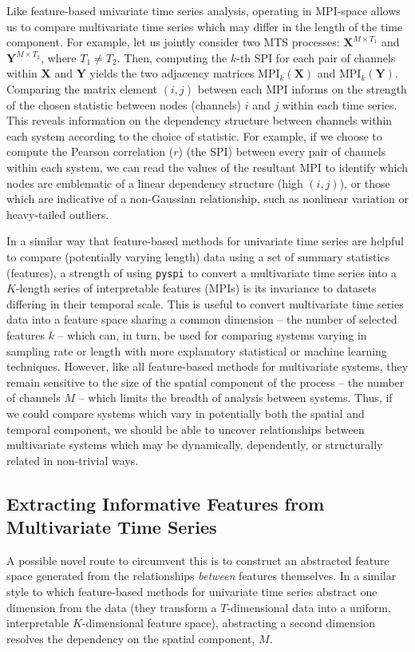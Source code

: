 Like feature-based univariate time series analysis, operating in MPI-space allows us to compare multivariate time series which may differ in the length of the time component. For example, let us jointly consider two MTS processes: $\mathbf{X}^{M \times T_1}$ and $\mathbf{Y}^{M \times T_2}$, where $T_1 \neq T_2$. Then, computing the $k$-th SPI for each pair of channels within $\mathbf{X}$ and $\mathbf{Y}$ yields the two adjacency matrices $\mathrm{MPI}_k({\mathbf{X}})$ and $\mathrm{MPI}_k({\mathbf{Y}})$. Comparing the matrix element $(i,j)$ between each MPI informs on the strength of the chosen statistic between nodes (channels) $i$ and $j$ within each time series. This reveals information on the dependency structure between channels within each system according to the choice of statistic. For example, if we choose to compute the Pearson correlation ($r$) (the SPI) between every pair of channels within each system, we can read the values of the resultant MPI to identify which nodes are emblematic of a linear dependency structure (high $(i,j)$), or those which are indicative of a non-Gaussian relationship, such as nonlinear variation or heavy-tailed outliers.

In a similar way that feature-based methods for univariate time series are helpful to compare (potentially varying length) data using a set of summary statistics (features), a strength of using \texttt{pyspi} to convert a multivariate time series into a $K$-length series of interpretable features (MPIs) is its invariance to datasets differing in their temporal scale. This is useful to convert multivariate time series data into a feature space sharing a common dimension -- the number of selected features $k$ -- which can, in turn, be used for comparing systems varying in sampling rate or length with more explanatory statistical or machine learning techniques. However, like all feature-based methods for multivariate systems, they remain sensitive to the size of the spatial component of the process -- the number of channels $M$ -- which limits the breadth of analysis between systems. Thus, if we could compare systems which vary in potentially both the spatial and temporal component, we should be able to uncover relationships between multivariate systems which may be dynamically, dependently, or structurally related in non-trivial ways.

\subsection{Extracting Informative Features from Multivariate Time Series}
A possible novel route to circumvent this is to construct an abstracted feature space generated from the relationships \textit{between} features themselves. In a similar style to which feature-based methods for univariate time series abstract one dimension from the data (they transform a $T$-dimensional data into a uniform, interpretable $K$-dimensional feature space), abstracting a second dimension resolves the dependency on the spatial component, $M$. 

